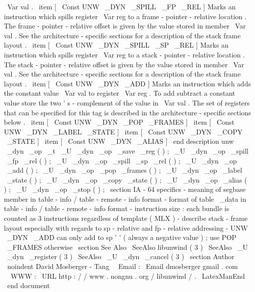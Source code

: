 \
Var
{
val
}
.
\
item
[
\
Const
{
UNW
\
_DYN
\
_SPILL
\
_FP
\
_REL
}
]
Marks
an
instruction
which
spills
register
\
Var
{
reg
}
to
a
frame
-
pointer
-
relative
location
.
The
frame
-
pointer
-
relative
offset
is
given
by
the
value
stored
in
member
\
Var
{
val
}
.
See
the
architecture
-
specific
sections
for
a
description
of
the
stack
frame
layout
.
\
item
[
\
Const
{
UNW
\
_DYN
\
_SPILL
\
_SP
\
_REL
}
]
Marks
an
instruction
which
spills
register
\
Var
{
reg
}
to
a
stack
-
pointer
-
relative
location
.
The
stack
-
pointer
-
relative
offset
is
given
by
the
value
stored
in
member
\
Var
{
val
}
.
See
the
architecture
-
specific
sections
for
a
description
of
the
stack
frame
layout
.
\
item
[
\
Const
{
UNW
\
_DYN
\
_ADD
}
]
Marks
an
instruction
which
adds
the
constant
value
\
Var
{
val
}
to
register
\
Var
{
reg
}
.
To
add
subtract
a
constant
value
store
the
two
'
s
-
complement
of
the
value
in
\
Var
{
val
}
.
The
set
of
registers
that
can
be
specified
for
this
tag
is
described
in
the
architecture
-
specific
sections
below
.
\
item
[
\
Const
{
UNW
\
_DYN
\
_POP
\
_FRAMES
}
]
\
item
[
\
Const
{
UNW
\
_DYN
\
_LABEL
\
_STATE
}
]
\
item
[
\
Const
{
UNW
\
_DYN
\
_COPY
\
_STATE
}
]
\
item
[
\
Const
{
UNW
\
_DYN
\
_ALIAS
}
]
\
end
{
description
}
unw
\
_dyn
\
_op
\
_t
\
_U
\
_dyn
\
_op
\
_save
\
_reg
(
)
;
\
_U
\
_dyn
\
_op
\
_spill
\
_fp
\
_rel
(
)
;
\
_U
\
_dyn
\
_op
\
_spill
\
_sp
\
_rel
(
)
;
\
_U
\
_dyn
\
_op
\
_add
(
)
;
\
_U
\
_dyn
\
_op
\
_pop
\
_frames
(
)
;
\
_U
\
_dyn
\
_op
\
_label
\
_state
(
)
;
\
_U
\
_dyn
\
_op
\
_copy
\
_state
(
)
;
\
_U
\
_dyn
\
_op
\
_alias
(
)
;
\
_U
\
_dyn
\
_op
\
_stop
(
)
;
\
section
{
IA
-
64
specifics
}
-
meaning
of
segbase
member
in
table
-
info
/
table
-
remote
-
info
format
-
format
of
table
\
_data
in
table
-
info
/
table
-
remote
-
info
format
-
instruction
size
:
each
bundle
is
counted
as
3
instructions
regardless
of
template
(
MLX
)
-
describe
stack
-
frame
layout
especially
with
regards
to
sp
-
relative
and
fp
-
relative
addressing
-
UNW
\
_DYN
\
_ADD
can
only
add
to
sp
'
'
(
always
a
negative
value
)
;
use
POP
\
_FRAMES
otherwise
\
section
{
See
Also
}
\
SeeAlso
{
libunwind
(
3
)
}
\
SeeAlso
{
\
_U
\
_dyn
\
_register
(
3
)
}
\
SeeAlso
{
\
_U
\
_dyn
\
_cancel
(
3
)
}
\
section
{
Author
}
\
noindent
David
Mosberger
-
Tang
\
\
Email
:
\
Email
{
dmosberger
gmail
.
com
}
\
\
WWW
:
\
URL
{
http
:
/
/
www
.
nongnu
.
org
/
libunwind
/
}
.
\
LatexManEnd
\
end
{
document
}

